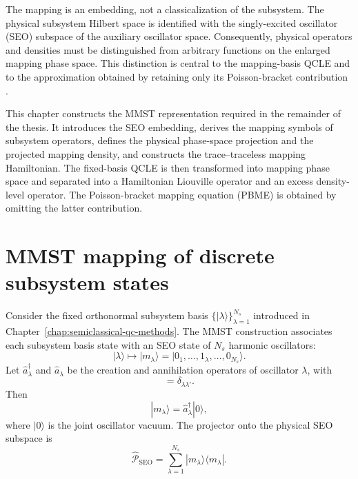 \documentclass[
  11pt,
  letterpaper,
  onehalfspacing,
  normalmargins,
  equalmargins,
  oneside
]{ut-thesis}
\begin{document}
The mapping is an embedding, not a classicalization of the subsystem. The
physical subsystem Hilbert space is identified with the singly-excited
oscillator (SEO) subspace of the auxiliary oscillator space. Consequently,
physical operators and densities must be distinguished from arbitrary
functions on the enlarged mapping phase space. This distinction is central to
the mapping-basis QCLE and to the approximation obtained by retaining only
its Poisson-bracket contribution
\cite{Kim2008JCP,NassimiBonellaKapral2010,Kelly2012JCP}.

This chapter constructs the MMST representation required in the remainder of
the thesis. It introduces the SEO embedding, derives the mapping symbols of
subsystem operators, defines the physical phase-space projection and the
projected mapping density, and constructs the trace--traceless mapping
Hamiltonian. The fixed-basis QCLE is then transformed into mapping phase space
and separated into a Hamiltonian Liouville operator and an excess
density-level operator. The Poisson-bracket mapping equation (PBME) is obtained
by omitting the latter contribution.


\section{MMST mapping of discrete subsystem states}
\label{sec:mmst-mapping-discrete-states}

Consider the fixed orthonormal subsystem basis
\(\{|\lambda\rangle\}_{\lambda=1}^{N_s}\) introduced in
Chapter~\ref{chap:semiclassical-qc-methods}. The MMST construction associates
each subsystem basis state with an SEO state of \(N_s\) harmonic oscillators:
\begin{equation}
|\lambda\rangle
\longmapsto
|m_\lambda\rangle
=
|0_1,\ldots,1_\lambda,\ldots,0_{N_s}\rangle .
\label{eq:mmst-state-mapping}
\end{equation}
Let \(\hat a_\lambda^\dagger\) and \(\hat a_\lambda\) be the creation and
annihilation operators of oscillator \(\lambda\), with
\begin{equation}
[\hat a_\lambda,\hat a_{\lambda'}^\dagger]
=
\delta_{\lambda\lambda'}.
\label{eq:mapping-boson-commutator}
\end{equation}
Then
\begin{equation}
|m_\lambda\rangle
=
\hat a_\lambda^\dagger|0\rangle,
\label{eq:mapping-state-creation}
\end{equation}
where \(|0\rangle\) is the joint oscillator vacuum. The projector onto the
physical SEO subspace is
\begin{equation}
\hat{\mathcal P}_{\mathrm{SEO}}
=
\sum_{\lambda=1}^{N_s}
|m_\lambda\rangle\langle m_\lambda|.
\label{eq:seo-projector-operator}
\end{equation}
\end{document}
